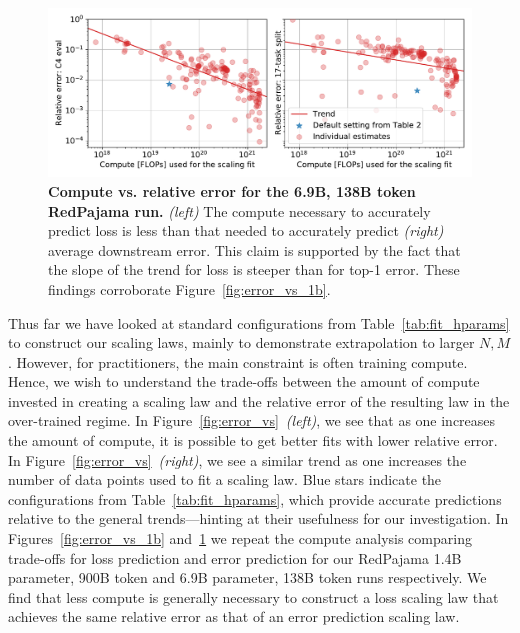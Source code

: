 \begin{appendix}
\begin{figure}
    \centering
    \includegraphics[width=0.98\linewidth]{figs/error_vs_7b.pdf}
    \caption{
    \textbf{Compute vs. relative error for the 6.9B, 138B token RedPajama run.}
    \emph{(left)} The compute necessary to accurately predict loss is less than that needed to accurately predict \emph{(right)} average downstream error.
    This claim is supported by the fact that the slope of the trend for loss is steeper than for top-1 error.
    These findings corroborate Figure~\ref{fig:error_vs_1b}.
    }
    \label{fig:error_vs_7b}
\end{figure}

Thus far we have looked at standard configurations from Table~\ref{tab:fit_hparams} to construct our scaling laws, mainly to demonstrate extrapolation to larger $N, M$.
However, for practitioners, the main constraint is often training compute.
Hence, we wish to understand the trade-offs between the amount of compute invested in creating a scaling law and the relative error of the resulting law in the over-trained regime.
In Figure~\ref{fig:error_vs}~\emph{(left)}, we see that as one increases the amount of compute, it is possible to get better fits with lower relative error.
In Figure~\ref{fig:error_vs}~\emph{(right)}, we see a similar trend as one increases the number of data points used to fit a scaling law.
Blue stars indicate the configurations from Table~\ref{tab:fit_hparams}, which provide accurate predictions relative to the general trends---hinting at their usefulness for our investigation.
In Figures~\ref{fig:error_vs_1b} and~\ref{fig:error_vs_7b} we repeat the compute analysis comparing trade-offs for loss prediction and error prediction for our RedPajama 1.4B parameter, 900B token and 6.9B parameter, 138B token runs respectively.
We find that less compute is generally necessary to construct a loss scaling law that achieves the same relative error as that of an error prediction scaling law.


\end{appendix}
